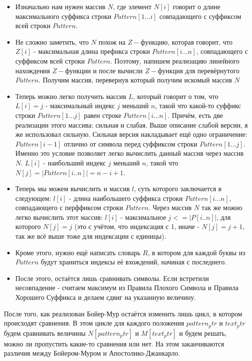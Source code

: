 \begin{itemize}
    \item Изначально нам нужен массив $N$, где элемент $N[i]$ говорит о длине максимального суффикса строки $Pattern[1...i]$ совпадающего с суффиксом всей строки $Pattern$. 
    \item Не сложно заметить, что $N$ похож на $Z-функцию$, которая говорит, что $Z[i]$ - максимальная длина префикса строки $Pattern[i ... n]$, совпадающего с суффиксом всей строки $Pattern$. Поэтому, напишем реализацию линейного нахождения $Z-функции$ и после вычисли $Z-функция$ для перевёрнутого $Pattern$. Получим массив, перевернув который получим искомый массив $N$
    \item Теперь можно легко получить массив $L$, который говорит о том, что $L[i] = j$ - максимальный индекс $j$ меньший $n$, такой что какой-то суффикс строки $Pattern[1 ... j]$ равен строке $Pattern[i ... n]$. Причём, есть две реализации этого массива: сильная и слабая. Выше описание слабой версии, я же использовал сильную. Сильная версия накладывает ещё одно ограничение: $Pattern[i - 1]$ отлично от символа перед суффиксом строки $Pattern[1 ... j]$. Именно это условие позволяет легко вычислить данный массив через массив $N$. $L[i]$ - наибольший индекс $j$ меньший $n$, такой что $N[j] = |Pattern[i .. n]| = n - i + 1$. 
    \item Теперь мы можем вычислить и массив $l$, суть которого заключается в следующем: $l[i]$ - длина наибольшего суффикса строки $Pattern[i ... n]$, совпадающего с перффиксом строки $Pattern$. Через массив $N$ так же можно легко вычислить этот массив: $l[i]$ - максимальное $j <= |P[i .. n]|$, для которого $N[j] = j$ (это с учётом, что индексация с 1, иначе - $N[j] = j + 1$, так же всё выше тоже для индексации с единицы).
    \item Кроме этого, нужно ещё написать словарь $R$, в котором для каждой буквы из $Pattern$ будут храниться индексы её вхождений, начиная с последнего.
    \item После этого, остаётся лишь сравнивать символы. Если встретили несовпадение - считаем максимум из Правила Плохого Символа и Правила Хорошего Суффикса и делаем сдвиг на указанную величину.
\end{itemize}

После того, как реализован Бойер-Мур остаётся изменить лишь цикл, в котором происходят сравнения. В этом цикле для каждого положения $pattern_ptr$ и $text_ptr$ будем сравнивать величины $N[pattern_ptr]$ и $M[text_ptr]$ и будем решать, можно ли пропустить какие-то сравнения или нет. На этом заканчиваются различия между Бойером-Муром и Апостолико-Джанкарло.

